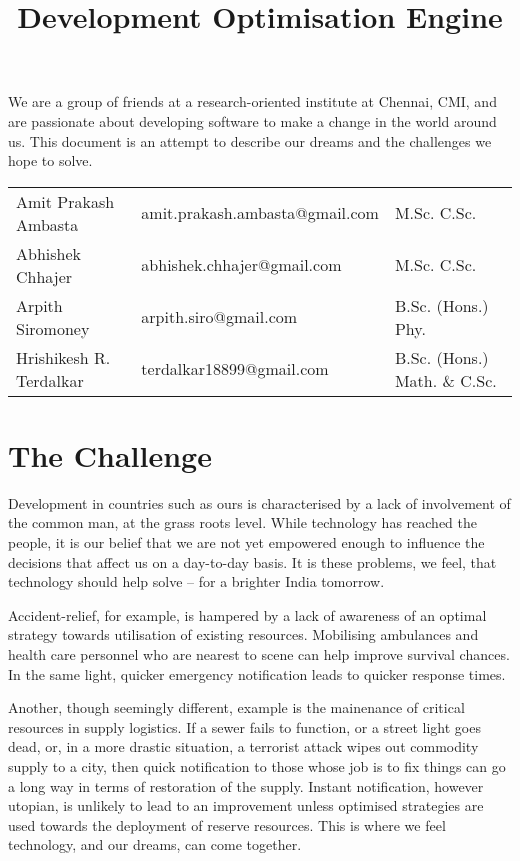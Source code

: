 \documentclass{report}
\begin{document}
\title{Development Optimisation Engine}

\maketitle
We are a group of friends at a research-oriented institute at Chennai, CMI, and are passionate about developing software to make a change in the world around us.  This document is an attempt to describe our dreams and the challenges we hope to solve.

\begin{tabular}{l|ll}
Amit Prakash Ambasta & amit.prakash.ambasta@gmail.com & M.Sc. C.Sc.\\
Abhishek Chhajer & abhishek.chhajer@gmail.com & M.Sc. C.Sc.\\
Arpith Siromoney & arpith.siro@gmail.com & B.Sc. (Hons.) Phy.\\
Hrishikesh R. Terdalkar & terdalkar18899@gmail.com & B.Sc. (Hons.) Math. \& C.Sc.\\
\end{tabular}

\section*{The Challenge}
Development in countries such as ours is characterised by a lack of involvement of the common man, at the grass roots level.  While technology has reached the people, it is our belief that we are not yet empowered enough to influence the decisions that affect us on a day-to-day basis.  It is these problems, we feel, that technology should help solve -- for a brighter India tomorrow.

Accident-relief, for example, is hampered by a lack of awareness of an optimal strategy towards utilisation of existing resources.  Mobilising ambulances and health care personnel who are nearest to scene can help improve survival chances.  In the same light, quicker emergency notification leads to quicker response times.

Another, though seemingly different, example is the mainenance of critical resources in supply logistics.  If a sewer fails to function, or a street light goes dead, or, in a more drastic situation, a terrorist attack wipes out commodity supply to a city, then quick notification to those whose job is to fix things can go a long way in terms of restoration of the supply.  Instant notification, however utopian, is unlikely to lead to an improvement unless optimised strategies are used towards the deployment of reserve resources.  This is where we feel technology, and our dreams, can come together.
\end{document}
